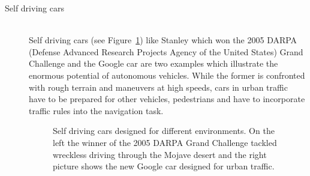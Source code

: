 \begin{description}
\item[Self driving cars]\hfill \\
Self driving cars (see Figure~\ref{fig:fig_auto}) like Stanley \cite{stanley} which won the 2005 DARPA (Defense Advanced Research Projects Agency of the United States) Grand Challenge and the Google car \cite{guizzo2011google} are two examples which illustrate the enormous potential of autonomous vehicles.
While the former is confronted with rough terrain and maneuvers at high speeds, cars in urban traffic have to be prepared for other vehicles, pedestrians and have to incorporate traffic rules into the navigation task. 

\begin{figure}[thpb]
	  \myfloatalign
      \footnotesize
      \centering
   \caption[Selfdriving car]{Self driving cars designed for different environments. On the left the winner of the 2005 DARPA Grand Challenge tackled wreckless driving through the Mojave desert and the right picture shows the new Google car designed for urban traffic.}
   \label{fig:fig_auto}
\end{figure}


\end{description}
